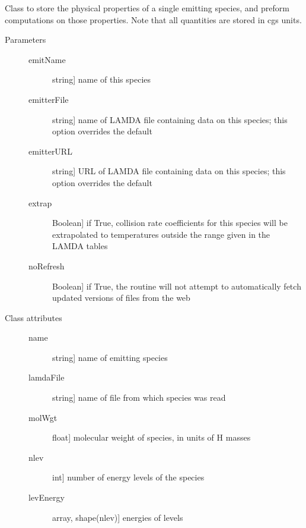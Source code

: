 \documentclass[letterpaper,10pt,english]{sphinxmanual}
\begin{document}
\begin{fulllineitems}
\label{fulldoc:despotic.emitterData}
Class to store the physical properties of a single emitting
species, and preform computations on those properties. Note that
all quantities are stored in cgs units.
\begin{description}
\item[{Parameters}] \leavevmode\begin{description}
\item[{emitName}] \leavevmode{[}string{]}
name of this species

\item[{emitterFile}] \leavevmode{[}string{]}
name of LAMDA file containing data on this species; this
option overrides the default

\item[{emitterURL}] \leavevmode{[}string{]}
URL of LAMDA file containing data on this species; this
option overrides the default

\item[{extrap}] \leavevmode{[}Boolean{]}
if True, collision rate coefficients for this species will
be extrapolated to temperatures outside the range given in
the LAMDA tables

\item[{noRefresh}] \leavevmode{[}Boolean{]}
if True, the routine will not attempt to automatically
fetch updated versions of files from the web

\end{description}

\item[{Class attributes}] \leavevmode\begin{description}
\item[{name}] \leavevmode{[}string{]}
name of emitting species

\item[{lamdaFile}] \leavevmode{[}string{]}
name of file from which species was read

\item[{molWgt}] \leavevmode{[}float{]}
molecular weight of species, in units of H masses

\item[{nlev}] \leavevmode{[}int{]}
number of energy levels of the species

\item[{levEnergy}] \leavevmode{[}array, shape(nlev){]}
energies of levels


\end{description}
\end{description}
\end{fulllineitems}
\end{document}
